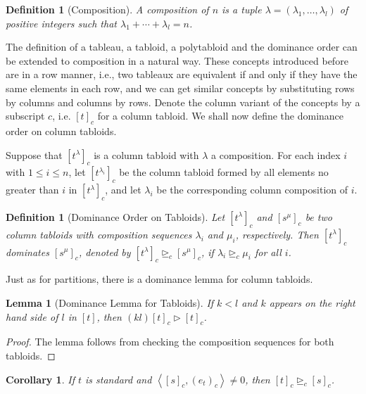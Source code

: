 \documentclass{assignment}[2019/10/15]
\newcommand{\lr}[3]{\left#1#3\right#2}
\theoremstyle{plain}
\newtheorem{definition}[theorem]{Definition}
\newtheorem{lemma}[theorem]{Lemma}
\newtheorem{corollary}[theorem]{Corollary}
\numberwithin{equation}{section}
\begin{document}
    \begin{definition}[Composition]
        A \emph{composition} of $n$ is a tuple $\lambda=(\lambda_1, \dotsc, \lambda_l)$ of positive integers such that $\lambda_1 + \dotsb + \lambda_l=n$.
    \end{definition}

    The definition of a tableau, a tabloid, a polytabloid and the dominance order can be extended to composition in a natural way. These concepts introduced before are in a row manner, i.e., two tableaux are equivalent if and only if they have the same elements in each row, and we can get similar concepts by substituting rows by columns and columns by rows. Denote the column variant of the concepts by a subscript $c$, i.e. $[t]_c$ for a column tabloid. We shall now define the dominance order on column tabloids.

    Suppose that $[t^\lambda]_c$ is a column tabloid with $\lambda$ a composition. For each index $i$ with $1\leq i\leq n$, let $[t^{\lambda_i}]_c$ be the column tabloid formed by all elements no greater than $i$ in $[t^\lambda]_c$, and let $\lambda_i$ be the corresponding column composition of $i$.

    \begin{definition}[Dominance Order on Tabloids]
        Let $[t^\lambda]_c$ and $[s^\mu]_c$ be two column tabloids with composition sequences $\lambda_i$ and $\mu_i$, respectively. Then $[t^\lambda]_c$ dominates $[s^\mu]_c$, denoted by $[t^\lambda]_c\unrhd_c [s^\mu]_c$, if $\lambda_i\unrhd_c\mu_i$ for all $i$.
    \end{definition}

    Just as for partitions, there is a dominance lemma for column tabloids.

    \begin{lemma}[Dominance Lemma for Tabloids]\label{lem: dom-tab}
        If $k<l$ and $k$ appears on the right hand side of $l$ in $[t]$, then $(k l)[t]_c\rhd[t]_c$.
    \end{lemma}

    \begin{proof}
        The lemma follows from checking the composition sequences for both tabloids.
    \end{proof}

    \begin{corollary}
        If $t$ is standard and $\lr<>{[s]_c, (e_t)_c}\neq 0$, then $[t]_c\unrhd_c [s]_c$.
    \end{corollary}
\end{document}
